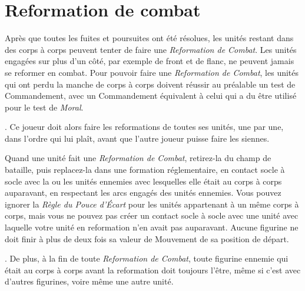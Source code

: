 \section{Reformation de combat}

Après que toutes les fuites et poursuites ont été résolues, les unités restant dans des corps à corps peuvent tenter de faire une \emph{Reformation de Combat}. Les unités engagées sur plus d'un côté, par exemple de front et de flanc, ne peuvent jamais se reformer en combat. Pour pouvoir faire une \emph{Reformation de Combat}, les unités qui ont perdu la manche de corps à corps doivent réussir au préalable un test de Commandement, avec un Commandement équivalent à celui qui a du être utilisé pour le test de \emph{Moral}.

. Ce joueur doit alors faire les reformations de toutes ses unités, une par une, dans l'ordre qui lui plaît, avant que l'autre joueur puisse faire les siennes.

Quand une unité fait une \emph{Reformation de Combat}, retirez-la du champ de bataille, puis replacez-la dans une formation réglementaire, en contact socle à socle avec la ou les unités ennemies avec lesquelles elle était au corps à corps auparavant, en respectant les arcs engagés des unités ennemies. Vous pouvez ignorer la \emph{Règle du Pouce d'Écart} pour les unités appartenant à un même corps à corps, mais vous ne pouvez pas créer un contact socle à socle avec une unité avec laquelle votre unité en reformation n'en avait pas auparavant. Aucune figurine ne doit finir à plus de deux fois sa valeur de Mouvement de sa position de départ.

. De plus, à la fin de toute \emph{Reformation de Combat}, toute figurine ennemie qui était au corps à corps avant la reformation doit toujours l'être, même si c'est avec d'autres figurines, voire même une autre unité.

